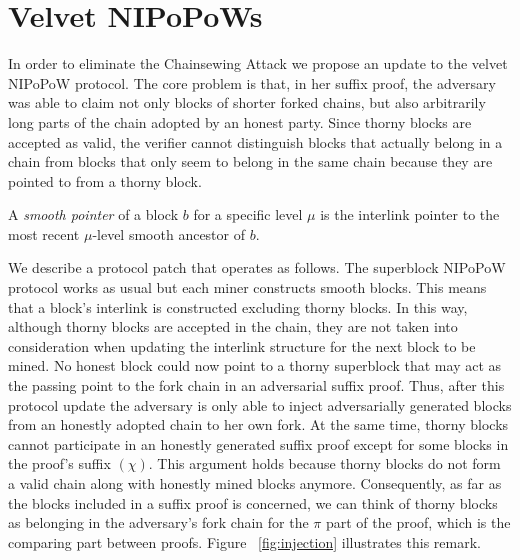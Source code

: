 \section{Velvet NIPoPoWs}\label{sec:construction}
In order to eliminate the Chainsewing Attack we propose an update to the velvet NIPoPoW protocol. The core problem is that, in her suffix proof, the adversary was able to claim not only blocks of shorter forked chains, but also arbitrarily long parts of the chain adopted by an honest party. Since thorny blocks are accepted as valid, the verifier cannot distinguish blocks that actually belong in a chain from blocks that only seem to belong in the same chain because they are pointed to from a thorny block.


\begin{definition}
  A \emph{smooth pointer} of a block $b$ for a specific level $\mu$ is the interlink pointer to the most recent $\mu$-level smooth ancestor of $b$.
	\label{defn:smooth_pointer}
\end{definition}

We describe a protocol patch that operates as follows. The superblock NIPoPoW protocol works as usual but each miner constructs smooth blocks. This means that  a block's interlink is constructed excluding thorny blocks. In this way, although thorny blocks are accepted in the chain, they are not taken into consideration when updating the interlink structure for the next block to be mined. No honest block could now point to a thorny superblock that may act as the passing point to the fork chain in an adversarial suffix proof. Thus, after this protocol update the adversary is only able to inject adversarially generated blocks from an honestly adopted chain to her own fork.
At the same time, thorny blocks cannot participate in an honestly generated suffix proof except for some blocks in the proof's suffix $(\chi)$. This argument holds because thorny blocks do not form a valid chain along with honestly mined blocks anymore. Consequently, as far as the blocks included in a suffix proof is concerned, we can think of thorny blocks as belonging in the adversary's fork chain for the $\pi$ part of the proof,  which is the comparing part between proofs. Figure~
\ref{fig:injection} illustrates this remark.

